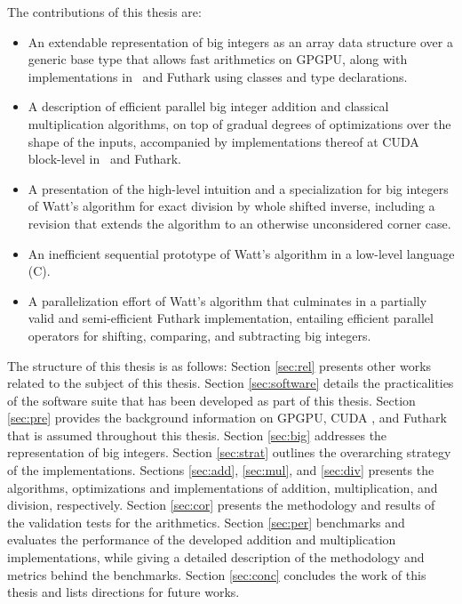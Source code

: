 The contributions of this thesis are:
\begin{itemize}
\item An extendable representation of big integers as an array data structure
  over a generic base type that allows fast arithmetics on GPGPU, along with
  implementations in \cpp\ and Futhark using classes and type declarations.
\item A description of efficient parallel big integer addition and classical
  multiplication algorithms, on top of gradual degrees of optimizations over the
  shape of the inputs, accompanied by implementations thereof at CUDA
  block-level in \cpp\ and Futhark.
\item A presentation of the high-level intuition and a specialization for big
  integers of Watt's algorithm for exact division by whole shifted inverse,
  including a revision that extends the algorithm to an otherwise unconsidered
  corner case.
\item An inefficient sequential prototype of Watt's algorithm in a low-level
  language (C).
\item A parallelization effort of Watt's algorithm that culminates in a
  partially valid and semi-efficient Futhark implementation, entailing efficient
  parallel operators for shifting, comparing, and subtracting big integers.
\end{itemize}
\bigskip

The structure of this thesis is as follows: Section \ref{sec:rel} presents other
works related to the subject of this thesis. Section \ref{sec:software} details
the practicalities of the software suite that has been developed as part of this
thesis. Section \ref{sec:pre} provides the background information on GPGPU, CUDA
\cpp, and Futhark that is assumed throughout this thesis. Section \ref{sec:big}
addresses the representation of big integers. Section \ref{sec:strat} outlines
the overarching strategy of the implementations. Sections \ref{sec:add},
\ref{sec:mul}, and \ref{sec:div} presents the algorithms, optimizations and
implementations of addition, multiplication, and division, respectively. Section
\ref{sec:cor} presents the methodology and results of the validation tests for
the arithmetics. Section \ref{sec:per} benchmarks and evaluates the performance
of the developed addition and multiplication implementations, while giving a
detailed description of the methodology and metrics behind the
benchmarks. Section \ref{sec:conc} concludes the work of this thesis and lists
directions for future works.

